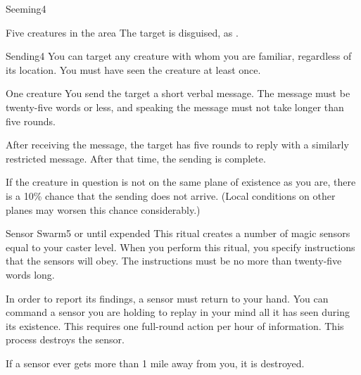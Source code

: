 \begin{spellsection}{Seeming}{4}
\spelldur \durlong \dismissable
\begin{spelltarget}{Five creatures in the area}
    \spelleffect The target is disguised, as .
\end{spelltarget}
\end{spellsection}

\begin{spellsection}{Sending}{4}
\spellspecial You can target any creature with whom you are familiar, regardless of its location. You must have seen the creature at least once.
\begin{spelltarget}{One creature}
    \spelleffect You send the target a short verbal message. The message must be twenty-five words or less, and speaking the message must not take longer than five rounds.

    After receiving the message, the target has five rounds to reply with a similarly restricted message. After that time, the sending is complete.
\end{spelltarget}
\spellnotes If the creature in question is not on the same plane of existence as you are, there is a 10\% chance that the sending does not arrive. (Local conditions on other planes may worsen this chance considerably.)
\end{spellsection}

\begin{spellsection}{Sensor Swarm}{5}
\spelldur \durext or until expended \dismissable
{}
\spellline
\spelleffect This ritual creates a number of magic sensors equal to your caster level. When you perform this ritual, you specify instructions that the sensors will obey. The instructions must be no more than twenty-five words long.

\par In order to report its findings, a sensor must return to your hand. You can command a sensor you are holding to replay in your mind all it has seen during its existence. This requires one full-round action per hour of information. This process destroys the sensor.

\par If a sensor ever gets more than 1 mile away from you, it is destroyed.
\spellnotes {}
\end{spellsection}

